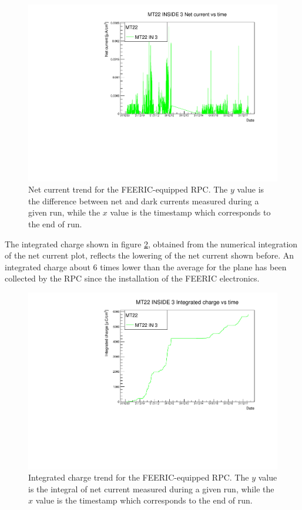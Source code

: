 \begin{figure}[!t]
\begin{center}
\includegraphics[width=0.7\linewidth]{Chapters/Performance/Figs/iNetFEERIC.pdf}
\caption{Net current trend for the FEERIC-equipped RPC. The $y$ value is the difference between net and dark currents measured during a given run, while the $x$ value is the timestamp which corresponds to the end of run.}
\label{fig:FEERICiNet}
\end{center}
\end{figure}

The integrated charge shown in figure \ref{fig:FEERICIntCharge}, obtained from the numerical integration of the net current plot, reflects the lowering of the net current shown before.
An integrated charge about $6$ times lower than the average for the plane has been collected by the RPC since the installation of the FEERIC electronics.

\begin{figure}[!t]
\begin{center}
\includegraphics[width=0.7\linewidth]{Chapters/Performance/Figs/IntChargeFEERIC.pdf}
\caption{Integrated charge trend for the FEERIC-equipped RPC. The $y$ value is the integral of net current measured during a given run, while the $x$ value is the timestamp which corresponds to the end of run.}
\label{fig:FEERICIntCharge}
\end{center}
\end{figure}

